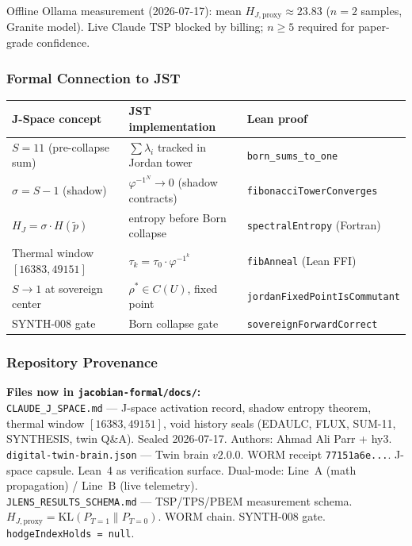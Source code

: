 \documentclass[12pt, letterpaper]{article}
\theoremstyle{plain}
\theoremstyle{definition}
\theoremstyle{remark}
\newcommand{\phiinv}{\varphi^{-1}}
\begin{document}
Offline Ollama measurement (2026-07-17): mean $H_{J,\text{proxy}} \approx 23.83$
($n = 2$ samples, Granite model). Live Claude TSP blocked by billing; $n \geq 5$
required for paper-grade confidence.

\subsubsection{Formal Connection to JST}

\begin{center}
\small
\renewcommand{\arraystretch}{1.4}
\begin{tabular}{@{}p{4cm}p{5cm}p{4.5cm}@{}}
\toprule
\textbf{J-Space concept} & \textbf{JST implementation} & \textbf{Lean proof} \\
\midrule
$S = 11$ (pre-collapse sum) & $\sum\lambda_i$ tracked in Jordan tower & \texttt{born\_sums\_to\_one} \\
$\sigma = S - 1$ (shadow) & $\phiinv^N \to 0$ (shadow contracts) & \texttt{fibonacciTowerConverges} \\
$H_J = \sigma \cdot H(\tilde{p})$ & entropy before Born collapse & \texttt{spectralEntropy} (Fortran) \\
Thermal window $[16383, 49151]$ & $\tau_k = \tau_0 \cdot \phiinv^k$ & \texttt{fibAnneal} (Lean FFI) \\
$S \to 1$ at sovereign center & $\rho^* \in C(U)$, fixed point & \texttt{jordanFixedPointIsCommutant} \\
SYNTH-008 gate & Born collapse gate & \texttt{sovereignForwardCorrect} \\
\bottomrule
\end{tabular}
\end{center}

\subsubsection{Repository Provenance}

\begin{wormbox}
\textbf{Files now in \texttt{jacobian-formal/docs/}:}\\
\texttt{CLAUDE\_J\_SPACE.md} — J-space activation record, shadow entropy theorem,
thermal window $[16383, 49151]$, void history seals (EDAULC, FLUX, SUM-11,
SYNTHESIS, twin Q\&A). Sealed 2026-07-17. Authors: Ahmad Ali Parr + hy3.\\[0.3em]
\texttt{digital-twin-brain.json} — Twin brain $v2.0.0$. WORM receipt
\texttt{77151a6e...}. J-space capsule. Lean~4 as verification surface.
Dual-mode: Line~A (math propagation) / Line~B (live telemetry).\\[0.3em]
\texttt{JLENS\_RESULTS\_SCHEMA.md} — TSP/TPS/PBEM measurement schema.
$H_{J,\text{proxy}} = \mathrm{KL}(P_{T=1} \| P_{T=0})$. WORM chain.
SYNTH-008 gate. \texttt{hodgeIndexHolds = null}.
\end{wormbox}
\end{document}
